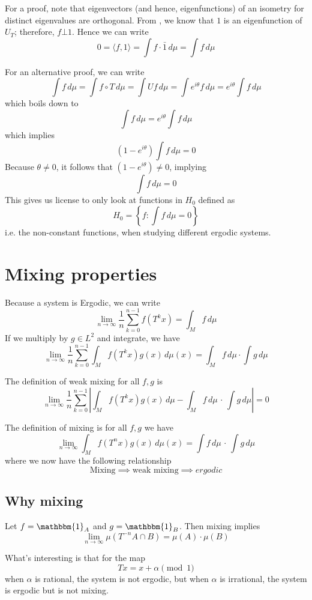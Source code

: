 \documentclass{article}
\begin{document}
For a proof, note that eigenvectors (and hence, eigenfunctions) of an isometry for distinct eigenvalues are orthogonal. From , we know that $1$ is an eigenfunction of $U_T$; therefore, $f\bot 1$. Hence we can write 
\[
0=\langle f, 1 \rangle = \int f\cdot \bar{1}\, d\mu = \int f\, d\mu
\]

For an alternative proof, we can write 
\[
\int f \, d\mu = \int f \circ T\, d\mu = \int Uf \, d\mu = \int e^{i\theta}f\, d\mu = e^{i\theta}\int f \, d\mu
\]
which boils down to 
\[
\int f \, d\mu = e^{i\theta}\int f \, d\mu
\]
which implies 
\[
\left( 1- e^{i\theta} \right)\int f \, d\mu = 0
\]
Because $\theta\neq 0$, it follows that $\left( 1- e^{i\theta} \right)\neq 0$, implying 
\[
\int f \, d\mu = 0
\]
This gives us license to only look at functions in $H_0$ defined as
\[
H_0 = \left\{f : \int f \, d\mu = 0 \right\}
\]
i.e. the non-constant functions, when studying different ergodic systems.

\section{Mixing properties}

Because a system is Ergodic, we can write
\[
\lim_{n\to\infty} \frac{1}{n}\sum_{k=0}^{n-1}f(T^k x)=\int_M f\, d\mu
\]
If we multiply by $g\in L^2$ and integrate, we have 
\[
\lim_{n\to\infty} \frac{1}{n}\sum_{k=0}^{n-1} \int_M f(T^k x) g(x) \,d\mu(x) = \int_M f\,d\mu \cdot \int g\, d\mu
\]

The definition of weak mixing for all $f,g$ is 
\[
\lim_{n\to \infty}\frac{1}{n}\sum_{k=0}^{n-1}\left| \int_{M} f\left(T^k x\right)g(x)\,d\mu - \int_M f\,d\mu\,\cdot\, \int g\,d\mu \right|=0
\]

The definition of mixing is for all $f,g$ we have
\[
\lim_{n\to \infty}\int_M f\left(T^n x\right) g(x)\, d\mu(x) = \int f\,d\mu \,\cdot\, \int g\, d\mu 
\]
where we now have the following relationship
\[
\text{Mixing}\implies \text{weak mixing} \implies ergodic
\]

\subsection{Why mixing}

Let $f=\mathbbm{1}_A$ and $g=\mathbbm{1}_B$. Then mixing implies 
\[
\lim_{n\to \infty }\mu\left(T^{-n}A\cap B\right)=\mu(A)\cdot\mu(B)
\]

What's interesting is that for the map
\[
Tx = x+\alpha \pmod 1
\]
when $\alpha$ is rational, the system is not ergodic, but when $\alpha$ is irrational, the system is ergodic but is not mixing.
\end{document}
